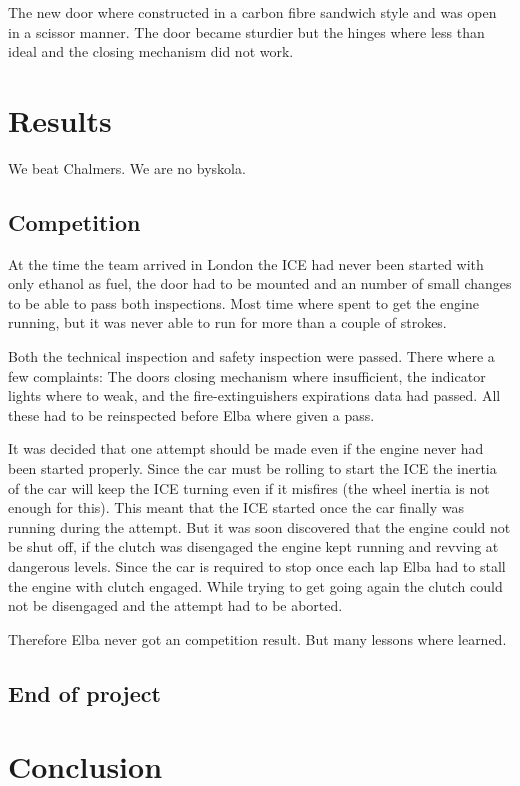 The new door where constructed in a carbon fibre sandwich style and was open in a scissor manner. The door became sturdier but the hinges where less than ideal and the closing mechanism did not work.

\section{Results}
We beat Chalmers. We are no byskola.
\subsection{Competition}
At the time the team arrived in London the ICE had never been started with only ethanol as fuel, the door had to be mounted and an number of small changes to be able to pass both inspections. Most time where spent to get the engine running, but it was never able to run for more than a couple of strokes. 

Both the technical inspection and safety inspection were passed. There where a few complaints: The doors closing mechanism where insufficient, the indicator lights where to weak, and the fire-extinguishers expirations data had passed. All these had to be reinspected before Elba where given a pass.

It was decided that one attempt should be made even if the engine never had been started properly. Since the car must be rolling to start the ICE the inertia of the car will keep the ICE turning even if it misfires (the wheel inertia is not enough for this). This meant that the ICE started once the car finally was running during the attempt. But it was soon discovered that the engine could not be shut off, if the clutch was disengaged the engine kept running and revving at dangerous levels. Since the car is required to stop once each lap Elba had to stall the engine with clutch engaged. While trying to get going again the clutch could not be disengaged and the attempt had to be aborted.

Therefore Elba never got an competition result. But many lessons where learned.

\subsection{End of project}

\section{Conclusion}
